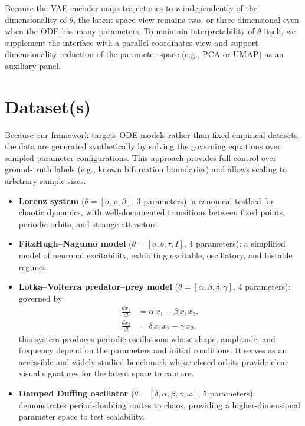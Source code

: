 \documentclass{article}
\begin{document}
Because the VAE encoder maps trajectories to $\mathbf{z}$ independently of the
dimensionality of $\theta$, the latent space view remains two- or
three-dimensional even when the ODE has many parameters. To maintain
interpretability of $\theta$ itself, we supplement the interface with a
parallel-coordinates view and support dimensionality reduction of the parameter
space (e.g., PCA or UMAP) as an auxiliary panel.

\section{Dataset(s)}

Because our framework targets ODE models rather than fixed empirical datasets,
the data are generated synthetically by solving the governing equations over
sampled parameter configurations. This approach provides full control over
ground-truth labels (e.g., known bifurcation boundaries) and allows scaling to
arbitrary sample sizes.

\begin{itemize}
    \item \textbf{Lorenz system} ($\theta = [\sigma, \rho, \beta]$, 3
    parameters): a canonical testbed for chaotic dynamics, with well-documented
    transitions between fixed points, periodic orbits, and strange attractors.

    \item \textbf{FitzHugh--Nagumo model} ($\theta = [a, b, \tau, I]$, 4
    parameters): a simplified model of neuronal excitability, exhibiting
    excitable, oscillatory, and bistable regimes.

    \item \textbf{Lotka--Volterra predator--prey model}
    ($\theta = [\alpha, \beta, \delta, \gamma]$, 4 parameters): governed by
    \begin{align}
        \frac{dx_1}{dt} &= \alpha\, x_1 - \beta\, x_1 x_2, \nonumber\\
        \frac{dx_2}{dt} &= \delta\, x_1 x_2 - \gamma\, x_2,
    \end{align}
    this system produces periodic oscillations whose shape, amplitude, and
    frequency depend on the parameters and initial conditions. It serves as an
    accessible and widely studied benchmark whose closed orbits provide clear
    visual signatures for the latent space to capture.

    \item \textbf{Damped Duffing oscillator} ($\theta = [\delta, \alpha,
    \beta, \gamma, \omega]$, 5 parameters): demonstrates period-doubling
    routes to chaos, providing a higher-dimensional parameter space to test
    scalability.
\end{itemize}
\end{document}
